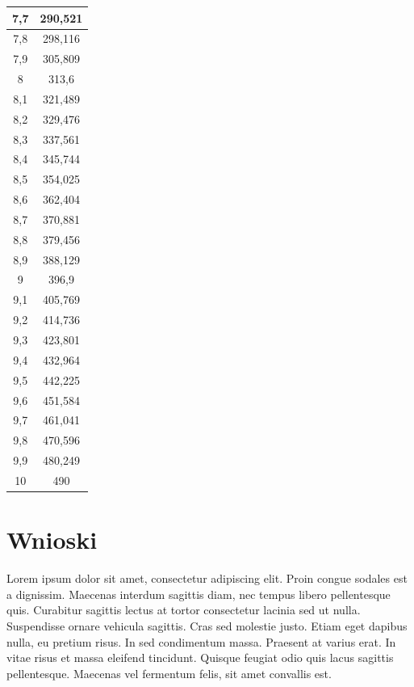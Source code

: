 \documentclass{article}
\begin{document}
\begin{center}
\begin{longtable}{|c|c|}
7,7 & 290,521 \\ \hline
7,8 & 298,116 \\ \hline
7,9 & 305,809 \\ \hline
8   & 313,6   \\ \hline
8,1 & 321,489 \\ \hline
8,2 & 329,476 \\ \hline
8,3 & 337,561 \\ \hline
8,4 & 345,744 \\ \hline
8,5 & 354,025 \\ \hline
8,6 & 362,404 \\ \hline
8,7 & 370,881 \\ \hline
8,8 & 379,456 \\ \hline
8,9 & 388,129 \\ \hline
9   & 396,9   \\ \hline
9,1 & 405,769 \\ \hline
9,2 & 414,736 \\ \hline
9,3 & 423,801 \\ \hline
9,4 & 432,964 \\ \hline
9,5 & 442,225 \\ \hline
9,6 & 451,584 \\ \hline
9,7 & 461,041 \\ \hline
9,8 & 470,596 \\ \hline
9,9 & 480,249 \\ \hline
10  & 490     \\ \hline
\end{longtable}
\end{center}


\section{Wnioski}
Lorem ipsum dolor sit amet, consectetur adipiscing elit. Proin congue sodales est a
dignissim. Maecenas interdum sagittis diam, nec tempus libero pellentesque quis. Curabitur
sagittis lectus at tortor consectetur lacinia sed ut nulla. Suspendisse ornare vehicula sagittis.
Cras sed molestie justo. Etiam eget dapibus nulla, eu pretium risus. In sed condimentum
massa. Praesent at varius erat. In vitae risus et massa eleifend tincidunt. Quisque feugiat
odio quis lacus sagittis pellentesque. Maecenas vel fermentum felis, sit amet convallis est.
 \\ 

\begin{center}
\end{center}
\end{document}
